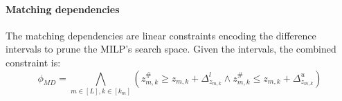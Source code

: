  



\paragraph{Matching dependencies}
 The matching dependencies are linear constraints encoding the difference intervals to prune the MILP's search space. 
Given the intervals, the combined constraint is: $$\phi_{MD}=\bigwedge_{m\in[L],k\in [k_m]} \left ( z^\#_{m,k} \geq z_{m,k}+\Delta^l_{z_{m,k}}\wedge  z^\#_{m,k} \leq z_{m,k}+\Delta^u_{z_{m,k}}\right )$$

